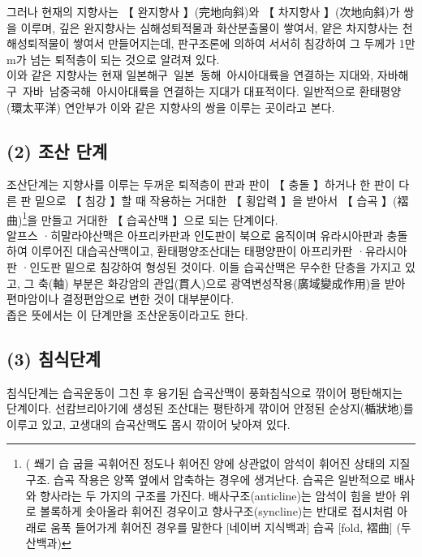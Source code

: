 \documentclass[12pt,a4paper]{book}
\newcommand{\SubSectionMargin}		{\newpage  \null \vskip 0cm}
\begin{document}
		그러나 현재의 지향사는 【 완지향사 】(完地向斜)와 【 차지향사 】(次地向斜)가 쌍을 이루며, 
		깊은 완지향사는 심해성퇴적물과 화산분출물이 쌓여서, 
		얕은 차지향사는 천해성퇴적물이 쌓여서 만들어지는데, 
		판구조론에 의하여 서서히 침강하여 그 두께가 1만 m가 넘는 퇴적층이 되는 것으로 알려져 있다. 
		\\[-1.0em]

		이와 같은 지향사는 현재 일본해구~일본~동해~아시아대륙을 연결하는 지대와, 
		자바해구~자바~남중국해~아시아대륙을 연결하는 지대가 대표적이다. 
		일반적으로 환태평양(環太平洋) 연안부가 이와 같은 지향사의 쌍을 이루는 곳이라고 본다. 




	\SubSectionMargin
	\subsection{(2) 조산 단계}
		조산단계는 지향사를 이루는 두꺼운 퇴적층이 판과 판이 【 충돌 】하거나 한 판이 다른 판 밑으로 【 침강 】할 때 
		작용하는 거대한 【 횡압력 】을 받아서 【 습곡 】(褶曲)\footnote{( 쐐기 습 굽을 곡휘어진 정도나 휘어진 양에 상관없이 암석이 휘어진 상태의 지질구조.
		습곡 작용은 양쪽 옆에서 압축하는 경우에 생겨난다.
		습곡은 일반적으로 배사와 향사라는 두 가지의 구조를 가진다. 
		배사구조(anticline)는 암석이 힘을 받아 위로 볼록하게 솟아올라 휘어진 경우이고 
		향사구조(syncline)는 반대로 접시처럼 아래로 움푹 들어가게 휘어진 경우를 말한다
		[네이버 지식백과] 습곡 [fold, 褶曲] (두산백과)}을 만들고 거대한 【 습곡산맥 】으로 되는 단계이다. 
		\\[-1.0em]

		알프스 ·히말라야산맥은 아프리카판과 인도판이 북으로 움직이며 유라시아판과 충돌하여 이루어진 대습곡산맥이고, 
		환태평양조산대는 태평양판이 아프리카판 ·유라시아판 ·인도판 밑으로 침강하여 형성된 것이다. 
		이들 습곡산맥은 무수한 단층을 가지고 있고, 
		그 축(軸) 부분은 화강암의 관입(貫人)으로 광역변성작용(廣域變成作用)을 받아 편마암이나 결정편암으로 변한 것이 대부분이다. 
		\\[-1.0em]

		좁은 뜻에서는 이 단계만을 조산운동이라고도 한다. 

	\SubSectionMargin
	\subsection{(3) 침식단계}
		침식단계는 습곡운동이 그친 후 융기된 습곡산맥이 풍화침식으로 깎이어 평탄해지는 단계이다. 
		선캄브리아기에 생성된 조산대는 평탄하게 깎이어 안정된 순상지(楯狀地)를 이루고 있고, 고생대의 습곡산맥도 몹시 깎이어 낮아져 있다. 
\end{document}
